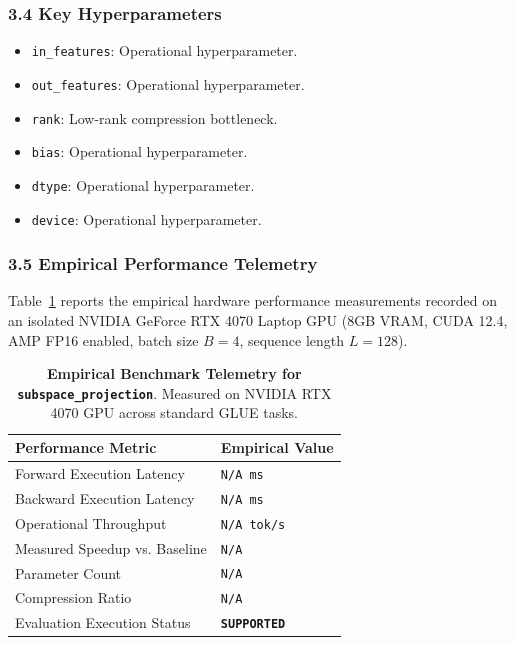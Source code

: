 \subsubsection*{3.4 Key Hyperparameters}
\begin{itemize}
    \item \texttt{in\_features}: Operational hyperparameter.
    \item \texttt{out\_features}: Operational hyperparameter.
    \item \texttt{rank}: Low-rank compression bottleneck.
    \item \texttt{bias}: Operational hyperparameter.
    \item \texttt{dtype}: Operational hyperparameter.
    \item \texttt{device}: Operational hyperparameter.
\end{itemize}

\subsubsection*{3.5 Empirical Performance Telemetry}
Table~\ref{tab:telemetry_subspace\_projection} reports the empirical hardware performance measurements recorded on an isolated NVIDIA GeForce RTX 4070 Laptop GPU (8GB VRAM, CUDA 12.4, AMP FP16 enabled, batch size $B=4$, sequence length $L=128$).

\begin{table}[h]
\centering
\small
\caption{\textbf{Empirical Benchmark Telemetry for \texttt{subspace\_projection}}. Measured on NVIDIA RTX 4070 GPU across standard GLUE tasks.}
\label{tab:telemetry_subspace\_projection}
\begin{tabularx}{\columnwidth}{lX}
\toprule
\textbf{Performance Metric} & \textbf{Empirical Value} \\
\midrule
Forward Execution Latency & \texttt{N/A ms} \\
Backward Execution Latency & \texttt{N/A ms} \\
Operational Throughput & \texttt{N/A tok/s} \\
Measured Speedup vs. Baseline & \texttt{N/A} \\
Parameter Count & \texttt{N/A} \\
Compression Ratio & \texttt{N/A} \\
Evaluation Execution Status & \textbf{\texttt{SUPPORTED}} \\
\bottomrule
\end{tabularx}
\end{table}


